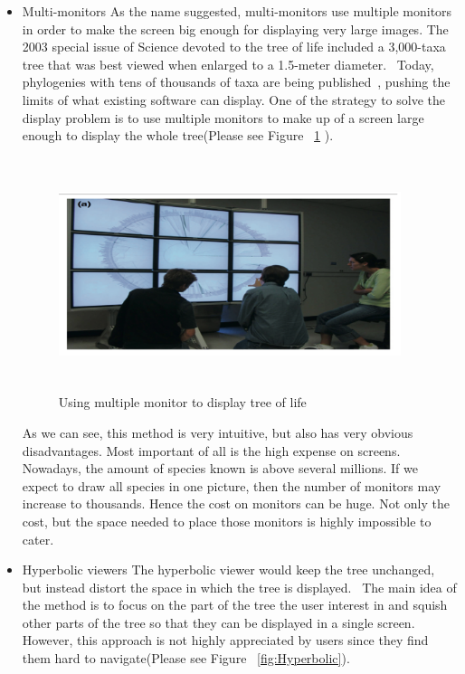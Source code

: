 \documentclass[MSc]{icldt}
\begin{document}
\begin{itemize}
  \item Multi-monitors
  As the name suggested, multi-monitors use multiple monitors in order to make the screen big enough for displaying very large images. The 2003 special issue of Science devoted to the tree of life included a 3,000-taxa tree that was best viewed when enlarged to a 1.5-meter diameter.~\cite{multipleMonitoring} Today, phylogenies with tens of thousands of taxa are being published~\cite{multipleMonitoring2}, pushing the limits of what existing software can display. One of the strategy to solve the display problem is to use multiple monitors to make up of a screen large enough to display the whole tree(Please see Figure ~\ref{fig:multipleMonitoring} ).
  
  \begin{figure}[H]
  \centering
  \includegraphics [width=10cm,height=6.8cm]{MultipleMonitoring}
  \caption{Using multiple monitor to display tree of life}
  \label{fig:multipleMonitoring}
\end{figure}
  
  As we can see, this method is very intuitive, but also has very obvious disadvantages. Most important of all is the high expense on screens. Nowadays, the amount of species known is above several millions. If we expect to draw all species in one picture, then the number of monitors may increase to thousands. Hence the cost on monitors can be huge. Not only the cost, but the space needed to place those monitors is highly impossible to cater.
  
  \item Hyperbolic viewers
  The hyperbolic viewer would keep the tree unchanged, but instead distort the space in which the tree is displayed.~\cite{euclidean} The main idea of the method is to focus on the part of the tree the user interest in and squish other parts of the tree so that they can be displayed in a single screen. However, this approach is not highly appreciated by users since they find them hard to navigate(Please see Figure ~\ref{fig:Hyperbolic}).
  

\end{itemize}
\end{document}
